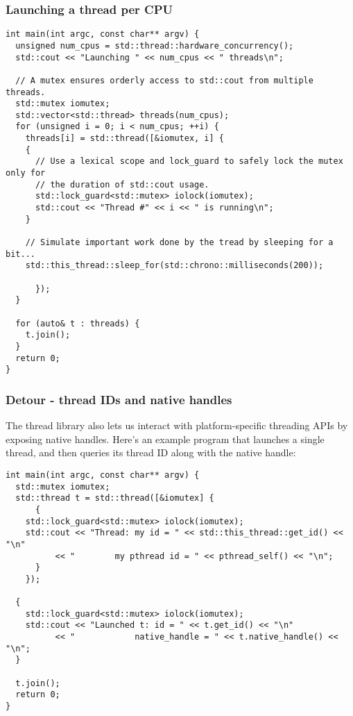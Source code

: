 \documentclass[11pt]{article}
\begin{document}
\subsubsection{Launching a thread per CPU}
\label{sec-7-1-3}
\begin{verbatim}
int main(int argc, const char** argv) {
  unsigned num_cpus = std::thread::hardware_concurrency();
  std::cout << "Launching " << num_cpus << " threads\n";

  // A mutex ensures orderly access to std::cout from multiple threads.
  std::mutex iomutex;
  std::vector<std::thread> threads(num_cpus);
  for (unsigned i = 0; i < num_cpus; ++i) {
    threads[i] = std::thread([&iomutex, i] {
	{
	  // Use a lexical scope and lock_guard to safely lock the mutex only for
	  // the duration of std::cout usage.
	  std::lock_guard<std::mutex> iolock(iomutex);
	  std::cout << "Thread #" << i << " is running\n";
	}

	// Simulate important work done by the tread by sleeping for a bit...
	std::this_thread::sleep_for(std::chrono::milliseconds(200));

      });
  }

  for (auto& t : threads) {
    t.join();
  }
  return 0;
}
\end{verbatim}

\subsubsection{Detour - thread IDs and native handles}
\label{sec-7-1-4}
The thread library also lets us interact with platform-specific threading APIs by exposing native handles. 
Here's an example program that launches a single thread, and then queries its thread ID along with the native handle:
\begin{verbatim}
int main(int argc, const char** argv) {
  std::mutex iomutex;
  std::thread t = std::thread([&iomutex] {
      {
	std::lock_guard<std::mutex> iolock(iomutex);
	std::cout << "Thread: my id = " << std::this_thread::get_id() << "\n"
		  << "        my pthread id = " << pthread_self() << "\n";
      }
    });

  {
    std::lock_guard<std::mutex> iolock(iomutex);
    std::cout << "Launched t: id = " << t.get_id() << "\n"
	      << "            native_handle = " << t.native_handle() << "\n";
  }

  t.join();
  return 0;
}
\end{verbatim}
\end{document}
